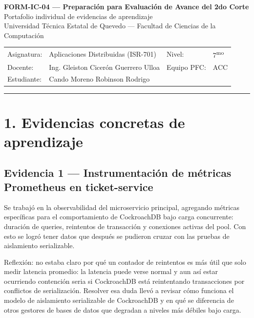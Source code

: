 \documentclass[12pt]{article}
\begin{document}
\begin{center}
{\Large\bfseries FORM-IC-04 --- Preparación para Evaluación de Avance del 2do Corte}\\[3pt]
{\normalsize Portafolio individual de evidencias de aprendizaje}\\[6pt]
{\small Universidad Técnica Estatal de Quevedo --- Facultad de Ciencias de la Computación}
\end{center}

\vspace{8pt}
\noindent
\begin{tabular}{@{}p{2.4cm}p{6.6cm}p{2.2cm}p{4.4cm}@{}}
Asignatura: & Aplicaciones Distribuidas (ISR-701) & Nivel: & 7\textsuperscript{mo} \\[3pt]
Docente: & Ing. Gleiston Cicerón Guerrero Ulloa & Equipo PFC: & ACC \\[3pt]
Estudiante: & Cando Moreno Robinson Rodrigo & & \\
\end{tabular}

\vspace{4pt}
\hrule
\vspace{6pt}

\section*{1. Evidencias concretas de aprendizaje}

\subsection*{Evidencia 1 --- Instrumentación de métricas Prometheus en ticket-service}
Se trabajó en la observabilidad del microservicio principal, agregando métricas específicas para el comportamiento de CockroachDB bajo carga concurrente: duración de queries, reintentos de transacción y conexiones activas del pool. Con esto se logró tener datos que después se pudieron cruzar con las pruebas de aislamiento serializable.

Reflexión: no estaba claro por qué un contador de reintentos es más útil que solo medir latencia promedio: la latencia puede verse normal y aun así estar ocurriendo contención seria si CockroachDB está reintentando transacciones por conflictos de serialización. Resolver esa duda llevó a revisar cómo funciona el modelo de aislamiento serializable de CockroachDB y en qué se diferencia de otros gestores de bases de datos que degradan a niveles más débiles bajo carga.
\end{document}
